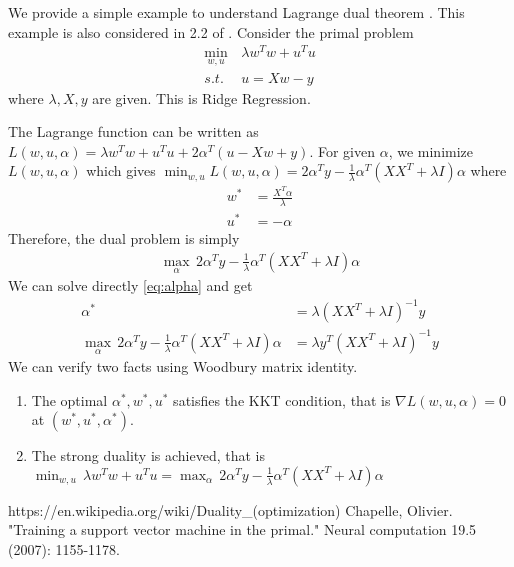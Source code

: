 \documentclass[a4paper, 12pt]{exam}
\begin{document}
	We provide a simple example to understand Lagrange dual theorem \cite{dual}.
	This example is also considered in 2.2 of \cite{primal}.
	Consider the primal problem
	\begin{align*}
	\min_{w, u} \, & \lambda w^T w + u^T u \\
	s.t. \, & u = Xw - y
	\end{align*}
	where $\lambda, X, y $ are given.
	This is Ridge Regression.
     
    The Lagrange function can be written as $L(w, u, \alpha) = \lambda w^T w + u^T u  + 2\alpha^T(u - Xw + y)$.
    For given $\alpha$, we minimize $L(w, u ,\alpha)$ which gives
    $\min_{w,u}L(w,u,\alpha) = 2\alpha^T y -\frac{1}{\lambda} \alpha^T (XX^T + \lambda I )\alpha$
    where
    \begin{align*}
    w^* & = \frac{X^T\alpha}{\lambda} \\
    u^* & = -\alpha
	\end{align*}
	Therefore, the dual problem is simply
	\begin{align}\label{eq:alpha}
	\max_{\alpha}\,  2\alpha^T y -\frac{1}{\lambda} \alpha^T (XX^T + \lambda I )\alpha
	\end{align}
	We can solve directly \eqref{eq:alpha} and get
	\begin{align}
	\alpha^* & = \lambda (XX^T + \lambda I )^{-1} y \\
	\max_{\alpha}\,  2\alpha^T y -\frac{1}{\lambda} \alpha^T (XX^T + \lambda I )\alpha
	& = \lambda y^T (XX^T + \lambda I )^{-1} y
	\end{align}
	We can verify two facts using Woodbury matrix identity.
	\begin{enumerate}
		\item The optimal $\alpha^*, w^*, u^*$ satisfies the KKT condition, that is
   		$\nabla L(w, u, \alpha) = 0$ at $(w^*, u^*, \alpha^*)$.		
		\item The strong duality is achieved, that is
		$\min_{w, u} \,  \lambda w^T w + u^T u = \max_{\alpha}\,  2\alpha^T y -\frac{1}{\lambda} \alpha^T (XX^T + \lambda I )\alpha$
	\end{enumerate}
	\begin{thebibliography}{9}
		 https://en.wikipedia.org/wiki/Duality\_(optimization)
		 Chapelle, Olivier. "Training a support vector machine in the primal." Neural computation 19.5 (2007): 1155-1178.
	\end{thebibliography}
\end{document}
